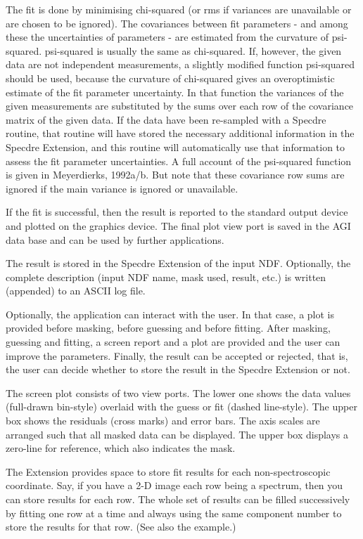 \begin{description}
\begin{description}
\begin{terminalv}
   The fit is done by minimising chi-squared (or rms if variances are
   unavailable or are chosen to be ignored). The covariances between
   fit parameters - and among these the uncertainties of parameters -
   are estimated from the curvature of psi-squared. psi-squared is
   usually the same as chi-squared. If, however, the given data are
   not independent measurements, a slightly modified function
   psi-squared should be used, because the curvature of chi-squared
   gives an overoptimistic estimate of the fit parameter uncertainty.
   In that function the variances of the given measurements are
   substituted by the sums over each row of the covariance matrix of
   the given data. If the data have been re-sampled with a Specdre
   routine, that routine will have stored the necessary additional
   information in the Specdre Extension, and this routine will
   automatically use that information to assess the fit parameter
   uncertainties. A full account of the psi-squared function is given
   in Meyerdierks, 1992a/b. But note that these covariance row sums
   are ignored if the main variance is ignored or unavailable.

   If the fit is successful, then the result is reported to
   the standard output device and plotted on the graphics device. The
   final plot view port is saved in the AGI data base and can be used
   by further applications.

   The result is stored in the Specdre Extension of the input NDF.
   Optionally, the complete description (input NDF name, mask used,
   result, etc.) is written (appended) to an ASCII log file.

   Optionally, the application can interact with the user. In that
   case, a plot is provided before masking, before guessing and
   before fitting. After masking, guessing and fitting, a screen
   report and a plot are provided and the user can improve the
   parameters. Finally, the result can be accepted or rejected, that
   is, the user can decide whether to store the result in the Specdre
   Extension or not.

   The screen plot consists of two view ports. The lower one shows the
   data values (full-drawn bin-style) overlaid with the guess or fit
   (dashed line-style). The upper box shows the residuals (cross
   marks) and error bars. The axis scales are arranged such that
   all masked data can be displayed. The upper box displays a
   zero-line for reference, which also indicates the mask.

   The Extension provides space to store fit results for each
   non-spectroscopic coordinate. Say, if you have a 2-D image each
   row being a spectrum, then you can store results for each row. The
   whole set of results can be filled successively by fitting one row
   at a time and always using the same component number to store the
   results for that row. (See also the example.)


\end{terminalv}
\end{description}
\end{description}
